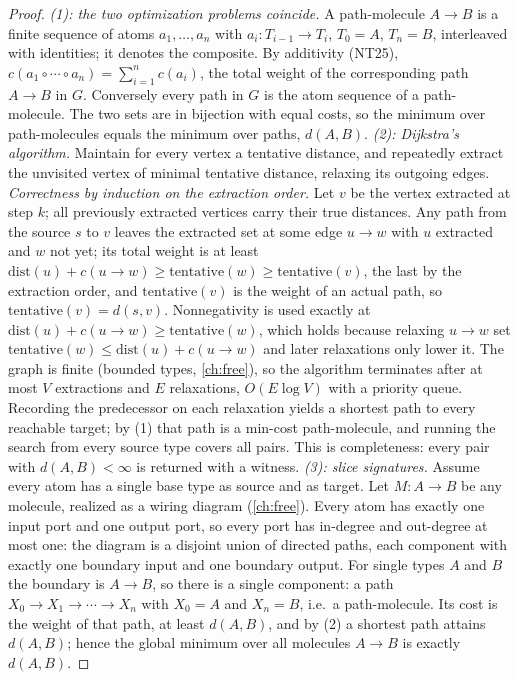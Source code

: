 \begin{proof}
\emph{(1): the two optimization problems coincide.} A path-molecule $A \to B$
is a finite sequence of atoms $a_1, \dots, a_n$ with $a_i \colon T_{i-1} \to
T_i$, $T_0 = A$, $T_n = B$, interleaved with identities; it denotes the
composite. By additivity (NT25),
$c(a_1 \circ \cdots \circ a_n) = \sum_{i=1}^{n} c(a_i)$, the total weight of
the corresponding path $A \to B$ in $G$. Conversely every path in $G$ is the
atom sequence of a path-molecule. The two sets are in bijection with equal
costs, so the minimum over path-molecules equals the minimum over paths,
$d(A,B)$.
\emph{(2): Dijkstra's algorithm.} Maintain for every vertex a tentative
distance, and repeatedly extract the unvisited vertex of minimal tentative
distance, relaxing its outgoing edges. \emph{Correctness by induction on the
extraction order.} Let $v$ be the vertex extracted at step $k$; all previously
extracted vertices carry their true distances. Any path from the source $s$ to
$v$ leaves the extracted set at some edge $u \to w$ with $u$ extracted and $w$
not yet; its total weight is at least
$\mathrm{dist}(u) + c(u \to w) \ge \mathrm{tentative}(w) \ge
\mathrm{tentative}(v)$, the last by the extraction order, and
$\mathrm{tentative}(v)$ is the weight of an actual path, so
$\mathrm{tentative}(v) = d(s, v)$. Nonnegativity is used exactly at
$\mathrm{dist}(u) + c(u \to w) \ge \mathrm{tentative}(w)$, which holds because
relaxing $u \to w$ set $\mathrm{tentative}(w) \le \mathrm{dist}(u) + c(u \to
w)$ and later relaxations only lower it. The graph is finite (bounded types,
\autoref{ch:free}), so the algorithm terminates after at most $V$ extractions
and $E$ relaxations, $O(E \log V)$ with a priority queue. Recording the
predecessor on each relaxation yields a shortest path to every reachable
target; by (1) that path is a min-cost path-molecule, and running the search
from every source type covers all pairs. This is completeness: every pair with
$d(A,B) < \infty$ is returned with a witness.
\emph{(3): slice signatures.} Assume every atom has a single base type as
source and as target. Let $M \colon A \to B$ be any molecule, realized as a
wiring diagram (\autoref{ch:free}). Every atom has exactly one input port and
one output port, so every port has in-degree and out-degree at most one: the
diagram is a disjoint union of directed paths, each component with exactly one
boundary input and one boundary output. For single types $A$ and $B$ the
boundary is $A \to B$, so there is a single component: a path
$X_0 \to X_1 \to \cdots \to X_n$ with $X_0 = A$ and $X_n = B$, i.e.\ a
path-molecule. Its cost is the weight of that path, at least $d(A,B)$, and by
(2) a shortest path attains $d(A,B)$; hence the global minimum over all
molecules $A \to B$ is exactly $d(A,B)$.
\end{proof}

